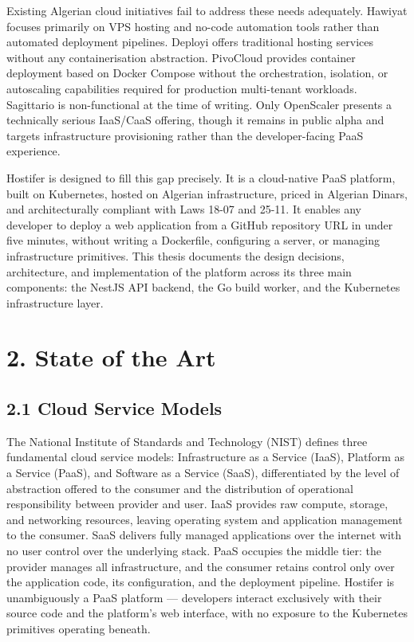 Existing Algerian cloud initiatives fail to address these needs adequately. Hawiyat focuses primarily on VPS hosting and no-code automation tools rather than automated deployment pipelines. Deployi offers traditional hosting services without any containerisation abstraction. PivoCloud provides container deployment based on Docker Compose without the orchestration, isolation, or autoscaling capabilities required for production multi-tenant workloads. Sagittario is non-functional at the time of writing. Only OpenScaler presents a technically serious IaaS/CaaS offering, though it remains in public alpha and targets infrastructure provisioning rather than the developer-facing PaaS experience.

Hostifer is designed to fill this gap precisely. It is a cloud-native PaaS platform, built on Kubernetes, hosted on Algerian infrastructure, priced in Algerian Dinars, and architecturally compliant with Laws 18-07 and 25-11. It enables any developer to deploy a web application from a GitHub repository URL in under five minutes, without writing a Dockerfile, configuring a server, or managing infrastructure primitives. This thesis documents the design decisions, architecture, and implementation of the platform across its three main components: the NestJS API backend, the Go build worker, and the Kubernetes infrastructure layer.

\section*{2. State of the Art}

\subsection*{2.1 Cloud Service Models}

The National Institute of Standards and Technology (NIST) defines three fundamental cloud service models: Infrastructure as a Service (IaaS), Platform as a Service (PaaS), and Software as a Service (SaaS), differentiated by the level of abstraction offered to the consumer and the distribution of operational responsibility between provider and user. IaaS provides raw compute, storage, and networking resources, leaving operating system and application management to the consumer. SaaS delivers fully managed applications over the internet with no user control over the underlying stack. PaaS occupies the middle tier: the provider manages all infrastructure, and the consumer retains control only over the application code, its configuration, and the deployment pipeline. Hostifer is unambiguously a PaaS platform — developers interact exclusively with their source code and the platform's web interface, with no exposure to the Kubernetes primitives operating beneath.

